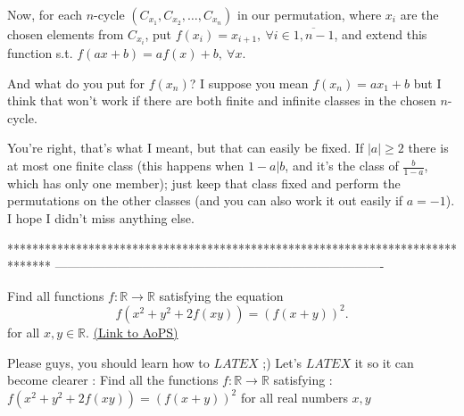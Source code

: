 \begin{solution}
	\begin{tcolorbox}Now, for each $n$-cycle $(C_{x_1},C_{x_2},\ldots,C_{x_n})$ in our permutation, where $x_i$ are the chosen elements from $C_{x_i}$, put $f(x_i)=x_{i+1},\ \forall i\in\overline{1,n-1}$, and extend this function s.t. $f(ax+b)=af(x)+b,\ \forall x$.\end{tcolorbox}
And what do you put for $f(x_n)$? I suppose you mean $f(x_n)=ax_1+b$ but I think that won't work if there are both finite and infinite classes in the chosen $n$-cycle.
\end{solution}



\begin{solution}
	You're right, that's what I meant, but that can easily be fixed. If $|a|\ge 2$ there is at most one finite class (this happens when $1-a|b$, and it's the class of $\frac b{1-a}$, which has only one member); just keep that class fixed and perform the permutations on the other classes (and you can also work it out easily if $a=-1$). I hope I didn't miss anything else.
\end{solution}
*******************************************************************************
-------------------------------------------------------------------------------

\begin{problem}
	Find all functions $f:\mathbb{R} \to \mathbb{R}$ satisfying the equation \[
	f(x^2+y^2+2f(xy)) = (f(x+y))^2.
\] for all $x,y \in \mathbb{R}$.
	\flushright \href{https://artofproblemsolving.com/community/c6h33734}{(Link to AoPS)}
\end{problem}



\begin{solution}
	Please guys, you should learn how to $LATEX$   ;) 
Let's $LATEX$ it so it can become clearer :   
Find all the functions $f: \mathbb R \rightarrow \mathbb R$ satisfying : 
$f(x^2+y^2+2f(xy))=(f(x+y))^2$ for all real numbers  $x,y$
\end{solution}



